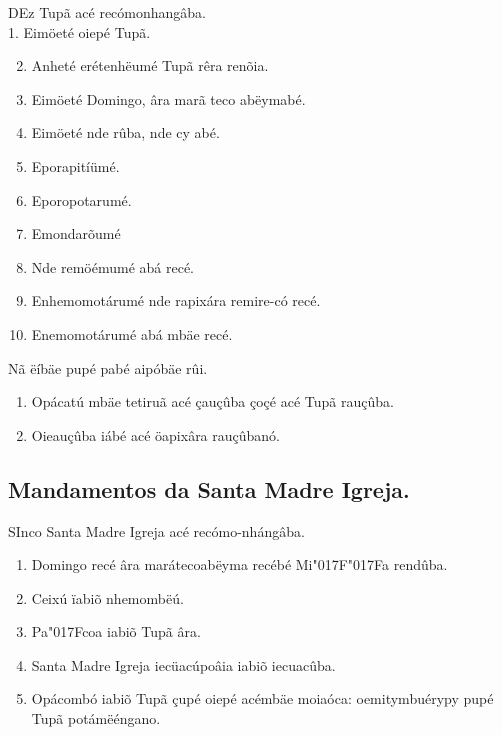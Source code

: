 \documentclass[openany,titlepage,12pt]{book}
\newcommand{\lgS}{\char"017F}
\newcommand{\lgSS}{\char"017F\char"017F}
\begin{document}
\lettrine[findent =4pt, nindent=0pt, lines=2]
{D}{E}z Tupã acé recómonhangâba.\\
1. Eimöeté oiepé Tupã.
\begin{enumerate}
    \setcounter{enumi}{1}
    \item Anheté erétenhëumé Tupã rêra renõia.
    \item Eimöeté Domingo, âra marã teco abëymabé.
    \item Eimöeté nde rûba, nde cy abé.
    \item Eporapitíümé.
    \item Eporopotarumé.
    \item Emondarõumé
    \item Nde remöémumé abá recé.
    \item Enhemomotárumé nde rapixára remire-có recé.
    \item Enemomotárumé abá mbäe recé.
\end{enumerate}

\noindent Nã ëíbäe pupé pabé aipóbäe rûi.
\begin{enumerate}
    \item Opácatú mbäe tetiruã acé çauçûba çoçé acé Tupã
    rauçûba.
    \item Oieauçûba iábé acé öapixâra rauçûbanó.
\end{enumerate}

\subsection{Mandamentos da Santa Madre Igreja.}

\lettrine[findent =2pt, nindent=0pt, lines=2]
{S}{I}nco Santa Madre Igreja acé recómo-\linebreak nhángâba.
\begin{enumerate}
    \item Domingo recé âra marátecoabëyma recébé Mi\lgSS a 
    rendûba.
    \item Ceixú ïabiõ nhemombëú.
    \item Pa\lgS coa iabiõ Tupã âra.
    \item Santa Madre Igreja iecüacúpoâia 
    iabiõ iecuacûba.
    \item Opácombó iabiõ Tupã çupé oiepé acémbäe moiaóca:
    oemitymbuérypy pupé Tupã potámëéngano.
\end{enumerate}
\end{document}
